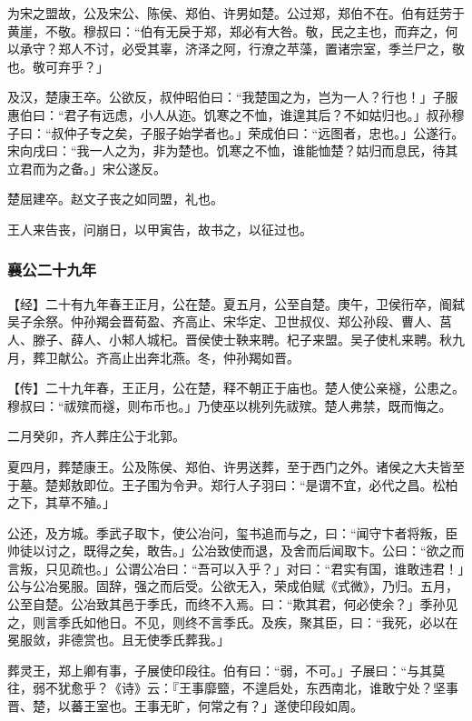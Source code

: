 \documentclass[]{article}
\begin{document}
为宋之盟故，公及宋公、陈侯、郑伯、许男如楚。公过郑，郑伯不在。伯有廷劳于黄崖，不敬。穆叔曰：``伯有无戾于郑，郑必有大咎。敬，民之主也，而弃之，何以承守？郑人不讨，必受其辜，济泽之阿，行潦之苹藻，置诸宗室，季兰尸之，敬也。敬可弃乎？」

及汉，楚康王卒。公欲反，叔仲昭伯曰：``我楚国之为，岂为一人？行也！」子服惠伯曰：``君子有远虑，小人从迩。饥寒之不恤，谁遑其后？不如姑归也。」叔孙穆子曰：``叔仲子专之矣，子服子始学者也。」荣成伯曰：``远图者，忠也。」公遂行。宋向戌曰：``我一人之为，非为楚也。饥寒之不恤，谁能恤楚？姑归而息民，待其立君而为之备。」宋公遂反。

楚屈建卒。赵文子丧之如同盟，礼也。

王人来告丧，问崩日，以甲寅告，故书之，以征过也。

\hypertarget{header-n2274}{%
\subsubsection{襄公二十九年}\label{header-n2274}}

【经】二十有九年春王正月，公在楚。夏五月，公至自楚。庚午，卫侯衎卒，阍弑吴子余祭。仲孙羯会晋荀盈、齐高止、宋华定、卫世叔仪、郑公孙段、曹人、莒人、滕子、薛人、小邾人城杞。晋侯使士鞅来聘。杞子来盟。吴子使札来聘。秋九月，葬卫献公。齐高止出奔北燕。冬，仲孙羯如晋。

【传】二十九年春，王正月，公在楚，释不朝正于庙也。楚人使公亲襚，公患之。穆叔曰：``祓殡而襚，则布币也。」乃使巫以桃列先祓殡。楚人弗禁，既而悔之。

二月癸卯，齐人葬庄公于北郭。

夏四月，葬楚康王。公及陈侯、郑伯、许男送葬，至于西门之外。诸侯之大夫皆至于墓。楚郏敖即位。王子围为令尹。郑行人子羽曰：``是谓不宜，必代之昌。松柏之下，其草不殖。」

公还，及方城。季武子取卞，使公冶问，玺书追而与之，曰：``闻守卞者将叛，臣帅徒以讨之，既得之矣，敢告。」公冶致使而退，及舍而后闻取卞。公曰：``欲之而言叛，只见疏也。」公谓公冶曰：``吾可以入乎？」对曰：``君实有国，谁敢违君！」公与公冶冕服。固辞，强之而后受。公欲无入，荣成伯赋《式微》，乃归。五月，公至自楚。公冶致其邑于季氏，而终不入焉。曰：``欺其君，何必使余？」季孙见之，则言季氏如他日。不见，则终不言季氏。及疾，聚其臣，曰：``我死，必以在冕服敛，非德赏也。且无使季氏葬我。」

葬灵王，郑上卿有事，子展使印段往。伯有曰：``弱，不可。」子展曰：``与其莫往，弱不犹愈乎？《诗》云：『王事靡盬，不遑启处，东西南北，谁敢宁处？坚事晋、楚，以蕃王室也。王事无旷，何常之有？」遂使印段如周。
\end{document}
